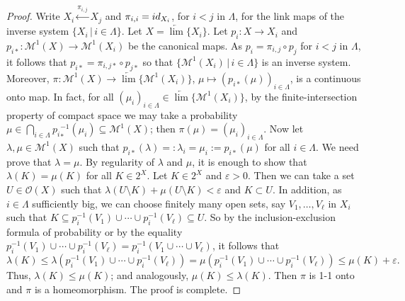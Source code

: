 \documentclass[10pt,a4paper]{amsart}
\begin{document}
\begin{proof}
Write $X_i\xleftarrow{\pi_{i,j}}X_j$ and $\pi_{i,i}=\textsl{id}_{X_i}$, for $i<j$ in $\Lambda$, for the link maps of the inverse system $\{X_i\,|\,i\in\Lambda\}$. Let $X=\underleftarrow{\lim}\{X_i\}$. Let $p_i\colon X\rightarrow X_i$ and $p_{i*}\colon\mathcal{M}^1(X)\rightarrow\mathcal{M}^1(X_i)$ be the canonical maps. As $p_i=\pi_{i,j}\circ p_j$ for $i<j$ in $\Lambda$, it follows that $p_{i*}=\pi_{i,j*}\circ p_{j*}$ so that $\{\mathcal{M}^1(X_i)\,|\,i\in\Lambda\}$ is an inverse system.
Moreover,
$\pi\colon\mathcal{M}^1(X)\rightarrow\underleftarrow{\lim}\{\mathcal{M}^1(X_i)\}$, $\mu\mapsto(p_{i*}(\mu))_{i\in\Lambda}$,
is a continuous onto map. In fact, for all $(\mu_i)_{i\in\Lambda}\in\underleftarrow{\lim}\{\mathcal{M}^1(X_i)\}$, by the finite-intersection property of compact space we may take a probability $\mu\in\bigcap_{i\in\Lambda}{p_i}_*^{-1}(\mu_i)\subseteq\mathcal{M}^1(X)$; then $\pi(\mu)=(\mu_i)_{i\in\Lambda}$.
Now let $\lambda, \mu\in\mathcal{M}^1(X)$ such that $p_{i*}(\lambda)=:\lambda_i=\mu_i:=p_{i*}(\mu)$ for all $i\in\Lambda$. We need prove that $\lambda=\mu$. By regularity of $\lambda$ and $\mu$, it is enough to show that $\lambda(K)=\mu(K)$ for all $K\in2^X$. Let $K\in2^X$ and $\varepsilon>0$. Then we can take a set $U\in\mathscr{O}(X)$ such that $\lambda(U\setminus K)+\mu(U\setminus K)<\varepsilon$ and $K\subset U$. In addition, as $i\in\Lambda$ sufficiently big, we can choose finitely many open sets, say $V_1,\dotsc,V_\ell$ in $X_i$ such that $K\subseteq p_i^{-1}(V_1)\cup\dotsm\cup p_i^{-1}(V_\ell)\subseteq U$. So by the inclusion-exclusion formula of probability or by the equality $p_i^{-1}(V_1)\cup\dotsm\cup p_i^{-1}(V_\ell)=p_i^{-1}(V_1\cup\dotsm\cup V_\ell)$, it follows that
\begin{equation*}
\lambda(K)\le\lambda(p_i^{-1}(V_1)\cup\dotsm\cup p_i^{-1}(V_\ell))
=\mu(p_i^{-1}(V_1)\cup\dotsm\cup p_i^{-1}(V_\ell))\le\mu(K)+\varepsilon.
\end{equation*}
Thus, $\lambda(K)\le\mu(K)$; and analogously, $\mu(K)\le\lambda(K)$. Then $\pi$ is 1-1 onto and $\pi$ is a homeomorphism. The proof is complete.
\end{proof}
\end{document}
